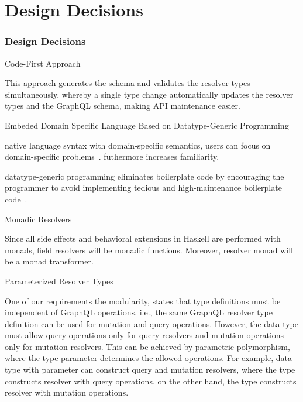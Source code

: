
\section{Design Decisions} 

\begin{frame}\frametitle{Design Decisions}
\begin{alertblock}{Code-First Approach}  

This approach generates the schema and validates the resolver types simultaneously, whereby a single type change automatically updates the resolver types and the GraphQL schema, making API maintenance easier.

\end{alertblock}

\begin{alertblock}{Embeded Domain Specific Language Based on Datatype-Generic Programming}  

native language syntax with domain-specific semantics, users can focus on domain-specific problems~\cite{edsl-modeling}. futhermore increases familiarity.

datatype-generic programming eliminates boilerplate code by encouraging the programmer to avoid implementing tedious and high-maintenance boilerplate code~\cite{scrap-your-boilerplate}.


\end{alertblock}

\begin{alertblock}{Monadic Resolvers} 

Since all side effects and behavioral extensions in Haskell are performed with monads, field resolvers will be monadic functions. 
Moreover, resolver monad will be a monad transformer. 

\end{alertblock}


\begin{alertblock}{Parameterized Resolver Types}

One of our requirements the modularity, states that type definitions must be independent of GraphQL operations. i.e., the same GraphQL resolver type definition can be used for mutation and query operations. However, the data type must allow query operations only for query resolvers and mutation operations only for mutation resolvers. This can be achieved by parametric polymorphism, where the type parameter determines the allowed operations. For example,  data type  with parameter  can construct query and mutation resolvers, where the type  constructs resolver  with query operations. on the other hand, the type  constructs resolver  with mutation operations.

\end{alertblock}
\end{frame}